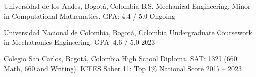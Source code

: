 \cvsection{\EducationLabel}

\cvedu
{Universidad de los Andes, Bogotá, Colombia}
{B.S. Mechanical Engineering, Minor in Computational Mathematics. GPA: 4.4 / 5.0}
{Ongoing}

\entryspace

\cvedu
{Universidad Nacional de Colombia, Bogotá, Colombia}
{Undergraduate Coursework in Mechatronics Engineering. GPA: 4.6 / 5.0}
{2023}

\entryspace

\cvedu
{Colegio San Carlos, Bogotá, Colombia}
{High School Diploma. SAT: 1320 (660 Math, 660 and Writing).  ICFES Saber 11: Top 1\% National Score}
{2017 -- 2023}



